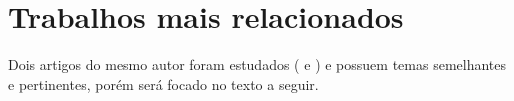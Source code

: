 
\section{Trabalhos mais relacionados}

Dois artigos do mesmo autor foram estudados (\cite{designAndImplementation2015} e \cite{developmentOfAn2016}) e possuem temas semelhantes e pertinentes, porém  será focado no texto a seguir.

